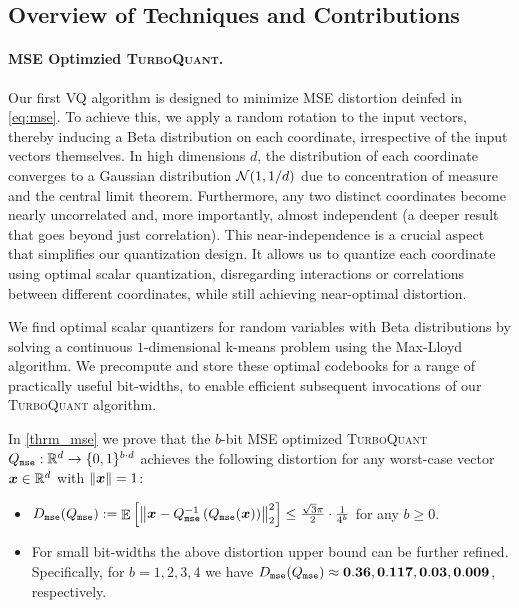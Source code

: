 \documentclass[11pt]{article}
\newcommand{\TurboQuant}{\textsc{TurboQuant}\xspace}
\begin{document}



\subsection{Overview of Techniques and Contributions}

\paragraph{MSE Optimzied \TurboQuant.}
Our first VQ algorithm is designed to minimize MSE distortion deinfed in \cref{eq:mse}.
To achieve this, we apply a random rotation to the input vectors, thereby inducing a Beta distribution on each coordinate, irrespective of the input vectors themselves.
In high dimensions $d$, the distribution of each coordinate converges to a Gaussian distribution $\mathcal{N}(1, 1/d)$ due to concentration of measure and the central limit theorem. 
Furthermore, any two distinct coordinates become nearly uncorrelated and, more importantly, almost independent (a deeper result that goes beyond just correlation).
This near-independence is a crucial aspect that simplifies our quantization design.
It allows us to quantize each coordinate using optimal scalar quantization, disregarding interactions or correlations between different coordinates, while still achieving near-optimal distortion.

We find optimal scalar quantizers for random variables with Beta distributions by solving a continuous $1$-dimensional k-means problem using the Max-Lloyd algorithm. 
We precompute and store these optimal codebooks for a range of practically useful bit-widths, to enable efficient subsequent invocations of our \TurboQuant algorithm.

In \cref{thrm_mse} we prove that the $b$-bit MSE optimized \TurboQuant $Q_{\tt mse}: \mathbb{R}^d \to \{ 0, 1 \}^{b \cdot d}$ achieves the following distortion for any worst-case vector ${\bm x} \in \mathbb{R}^d$ with $\left\| {\bm x} \right\|=1$:
\begin{itemize}
    \item $D_{\tt mse}(Q_{\tt mse}) := \mathop{{\mathbb{E}}}\left[\left\| {\bm x} - Q_{\tt mse}^{-1}\left( Q_{\tt mse}({\bm x}) \right) \right\|_2^2 \right] \le \frac{\sqrt{3} \pi}{2} \cdot \frac{1}{4^{b}}$ for any $b \ge 0$.
    \item For small bit-widths the above distortion upper bound can be further refined. 
    Specifically, for $b = 1, 2, 3, 4$ we have $D_{\tt mse}(Q_{\tt mse}) \approx {\bf 0.36}, {\bf 0.117}, {\bf 0.03}, {\bf 0.009}$, respectively.
\end{itemize}
\end{document}
